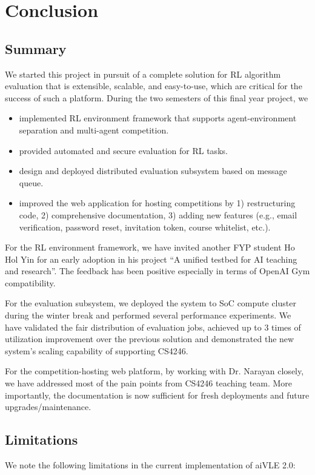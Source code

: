 \chapter{Conclusion}
\label{ch:conclusion}

\section{Summary}
\label{s:conclusion-summary}
We started this project in pursuit of a complete solution for RL algorithm evaluation that is extensible, scalable, and easy-to-use, which are critical for the success of such a platform. During the two semesters of this final year project, we
\begin{itemize}
    \item implemented RL environment framework that supports agent-environment separation and multi-agent competition.
    \item provided automated and secure evaluation for RL tasks.
    \item design and deployed distributed evaluation subsystem based on message queue.
    \item improved the web application for hosting competitions by 1) restructuring code, 2) comprehensive documentation, 3) adding new features (e.g., email verification, password reset, invitation token, course whitelist, etc.).
\end{itemize}

For the RL environment framework, we have invited another FYP student Ho Hol Yin for an early adoption in his project ``A unified testbed for AI teaching and research''. The feedback has been positive especially in terms of OpenAI Gym compatibility.

For the evaluation subsystem, we deployed the system to SoC compute cluster during the winter break and performed several performance experiments. We have validated the fair distribution of evaluation jobs, achieved up to 3 times of utilization improvement over the previous solution and demonstrated the new system’s scaling capability of supporting CS4246.

For the competition-hosting web platform, by working with Dr. Narayan closely, we have addressed most of the pain points from CS4246 teaching team. More importantly, the documentation is now sufficient for fresh deployments and future upgrades/maintenance.

\section{Limitations}
\label{s:conclusion-limitations}
We note the following limitations in the current implementation of aiVLE 2.0:

